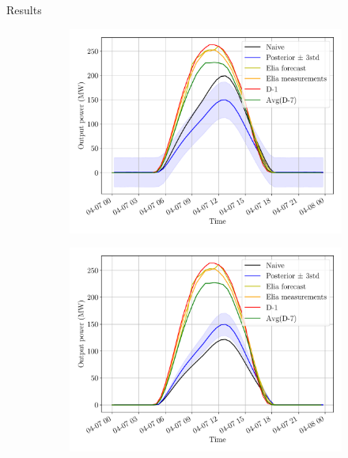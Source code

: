 \documentclass[12pt]{beamer}
\begin{document}
\begin{frame}{Results}
    \begin{figure}[H]
	\centering
	\begin{subfigure}{0.48\textwidth}
		\centering
		\includegraphics[width=\textwidth]{resources/pdf/solar_panelwise_START_FOR_07-04-2020.pdf}
	\end{subfigure}
	\hspace{0em}
	\begin{subfigure}{0.48\textwidth}
		\centering
		\includegraphics[width=\textwidth]{resources/pdf/solar_provincial_START_FOR_07-04-2020.pdf}
	\end{subfigure}
\end{figure}
\end{frame}
\end{document}
